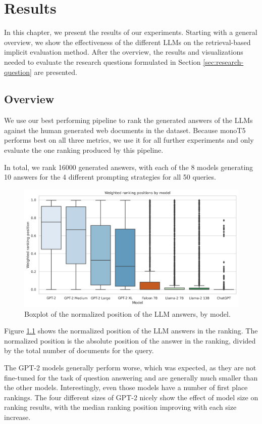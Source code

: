 \chapter{Results}\label{chapter:results}
In this chapter, we present the results of our experiments.
Starting with a general overview, we show the effectiveness of the different LLMs on the retrieval-based implicit evaluation method.
After the overview, the results and visualizations needed to evaluate the research questions formulated in Section \ref{sec:research-question} are presented.

\section{Overview}
We use our best performing pipeline to rank the generated answers of the LLMs against the human generated web documents in the dataset.
Because monoT5 performs best on all three metrics, we use it for all further experiments and only evaluate the one ranking produced by this pipeline.

In total, we rank 16000 generated answers, with each of the 8 models generating 10 answers for the 4 different prompting strategies for all 50 queries.
\begin{figure}
\centering
\includegraphics[width=\textwidth]{images/weighted_position_boxplot.png}
\caption{Boxplot of the normalized position of the LLM answers, by model. }
\label{fig:weighted_position_boxplot}
\end{figure}
Figure \ref{fig:weighted_position_boxplot} shows the normalized position of the LLM answers in the ranking.
The normalized position is the absolute position of the answer in the ranking, divided by the total number of documents for the query.


The GPT-2 models generally perform worse, which was expected, as they are not fine-tuned for the task of question answering and are generally much smaller than the other models.
Interestingly, even those models have a number of first place rankings.
The four different sizes of GPT-2 nicely show the effect of model size on ranking results, with the median ranking position improving with each size increase.

